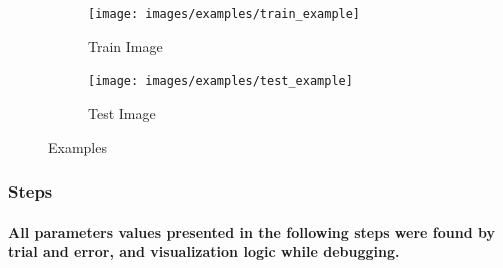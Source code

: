 \documentclass[12pt]{article}
\begin{document}
    \begin{figure}[!h]
        \centering
        \begin{subfigure}{.5\textwidth}
            \centering
            \texttt{[image: images/examples/train\_example]}
            \caption{Train Image}
            \label{fig:train_image}
        \end{subfigure}%
        \begin{subfigure}{.5\textwidth}
            \centering
            \texttt{[image: images/examples/test\_example]}
            \caption{Test Image}
            \label{fig:test_image}
        \end{subfigure}
        \caption{Examples}
        \label{fig:examples}
    \end{figure}

    \subsubsection{Steps}

    \paragraph{All parameters values presented in the following steps were found by trial and error, and visualization logic while debugging.}
\end{document}
